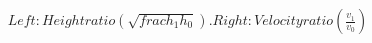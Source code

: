 \documentclass[preview]{standalone}
\begin{document}
\begin{align*}
Left: Height ratio (\sqrt{frac{h_1}{h_0}}). Right: Velocity ratio (\frac{v_1}{v_0})
\end{align*}
\end{document}
